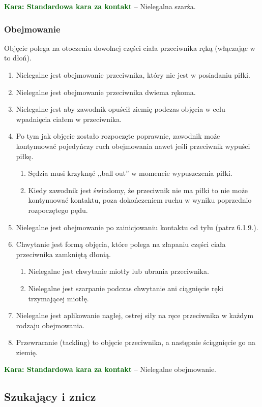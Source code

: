 \documentclass[11pt,a4paper]{article}
\newcommand\penaltyd[2]{\bgroup\textcolor{darkgreen}{\textbf{Kara: #1}} -- #2}
\begin{document}
\penaltyd{Standardowa kara za kontakt}{Nielegalna szarża.}

\subsubsection{Obejmowanie}
Objęcie polega na otoczeniu dowolnej części ciała przeciwnika ręką (włączając w to dłoń).
\begin{enumerate}
  \item Nielegalne jest obejmowanie przeciwnika, który nie jest w posiadaniu piłki.
  \item Nielegalne jest obejmowanie przeciwnika dwiema rękoma.
  \item Nielegalne jest aby zawodnik opuścił ziemię podczas objęcia w celu wpadnięcia ciałem w przeciwnika.
  \item Po tym jak objęcie zostało rozpoczęte poprawnie, zawodnik może kontynuować pojedyńczy ruch obejmowania nawet jeśli przeciwnik wypuści piłkę.
  \begin{enumerate}
    \item Sędzia musi krzyknąć ,,ball out'' w momencie wypuszczenia piłki.
    \item Kiedy zawodnik jest świadomy, że przeciwnik nie ma piłki to nie może kontynuować kontaktu, poza dokończeniem ruchu w wyniku poprzednio rozpoczętego pędu.
  \end{enumerate}
  \item Nielegalne jest obejmowanie po zainicjowaniu kontaktu od tyłu (patrz 6.1.9.). %
  \item Chwytanie jest formą objęcia, które polega na złapaniu części ciała przeciwnika zamkniętą dłonią.
  \begin{enumerate}
    \item Nielegalne jest chwytanie miotły lub ubrania przeciwnika.
    \item Nielegalne jest szarpanie podczas chwytanie ani ciągnięcie ręki trzymającej miotłę.
  \end{enumerate}
  \item Nielegalne jest aplikowanie nagłej, ostrej siły na ręce przeciwnika w każdym rodzaju obejmowania.
  \item Przewracanie (tackling) to objęcie przeciwnika, a następnie ściągnięcie go na ziemię.
\end{enumerate}

\penaltyd{Standardowa kara za kontakt}{Nielegalne obejmowanie.}

\subsection{Szukający i znicz}
\end{document}
